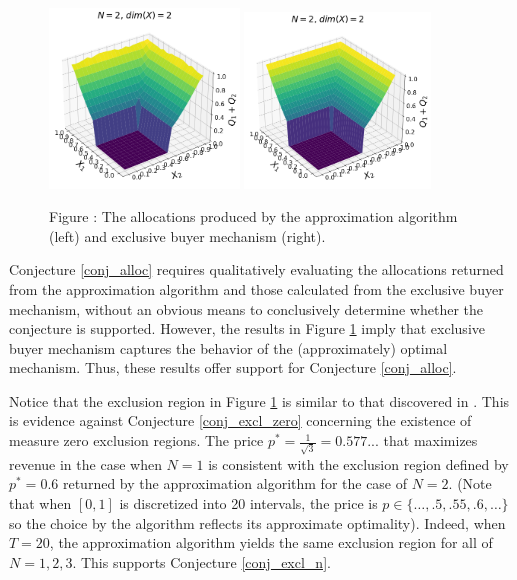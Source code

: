 \documentclass{article}
\newcounter{fig}
\begin{document}
\begin{figure}[H]
    \begin{center}
    \includegraphics[width=0.45\textwidth]{images/symmetric_independent_unif_01.png}
    \includegraphics[width=0.44\textwidth]{images/symmetric_independent_unif_01_ebm.png}
    \end{center}
    
    \vspace{1mm}
    \raggedright{\small {\sc Figure \thefig\label{fig:pavlov_n2_alloc}:} The allocations produced by the approximation algorithm (left) and exclusive buyer mechanism (right).} 
\end{figure}

\noindent Conjecture \ref{conj_alloc} requires qualitatively evaluating the allocations returned from the approximation algorithm and those calculated from the exclusive buyer mechanism, without an obvious means to conclusively determine whether the conjecture is supported. However, the results in Figure \ref{fig:pavlov_n2_alloc} imply that exclusive buyer mechanism captures the behavior of the (approximately) optimal mechanism. Thus, these results offer support for Conjecture \ref{conj_alloc}.

Notice that the exclusion region in Figure \ref{fig:pavlov_n2_alloc} is similar to that discovered in \autocite{pavlov2011optimal}. This is evidence against Conjecture \ref{conj_excl_zero} concerning the existence of measure zero exclusion regions. The price $p^* = \frac{1}{\sqrt{3}} = 0.577...$ that maximizes revenue in the case when $N=1$ is consistent with the exclusion region defined by $p^* = 0.6$ returned by the approximation algorithm for the case of $N=2$. (Note that when $[0,1]$ is discretized into 20 intervals, the price is $p \in \{\dots, .5, .55, .6, \dots\}$ so the choice by the algorithm reflects its approximate optimality). Indeed, when $T=20$, the approximation algorithm yields the same exclusion region for all of $N=1,2,3$. This supports Conjecture \ref{conj_excl_n}.
\end{document}

